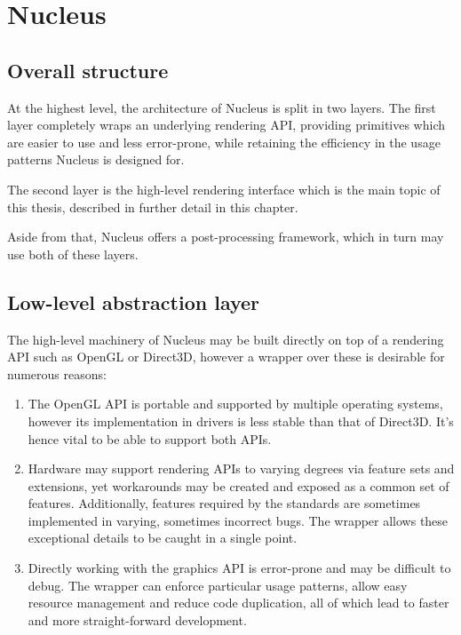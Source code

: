 
\chapter{ Nucleus }
\label{Chapter4}

\section{Overall structure}

At the highest level, the architecture of Nucleus is split in two layers. The first layer completely wraps an underlying rendering API, providing primitives which are easier to use and less error-prone, while retaining the efficiency in the usage patterns Nucleus is designed for.

The second layer is the high-level rendering interface which is the main topic of this thesis, described in further detail in this chapter.

Aside from that, Nucleus offers a post-processing framework, which in turn may use both of these layers.

\section{Low-level abstraction layer}

The high-level machinery of Nucleus may be built directly on top of a rendering API such as OpenGL or Direct3D, however a wrapper over these is desirable for numerous reasons:

\begin{enumerate}
\item The OpenGL API is portable and supported by multiple operating systems, however its implementation in drivers is less stable than that of Direct3D. It's hence vital to be able to support both APIs.
\item Hardware may support rendering APIs to varying degrees via feature sets and extensions, yet workarounds may be created and exposed as a common set of features. Additionally, features required by the standards are sometimes implemented in varying, sometimes incorrect bugs. The wrapper allows these exceptional details to be caught in a single point.
\item Directly working with the graphics API is error-prone and may be difficult to debug. The wrapper can enforce particular usage patterns, allow easy resource management and reduce code duplication, all of which lead to faster and more straight-forward development.
\end{enumerate}

